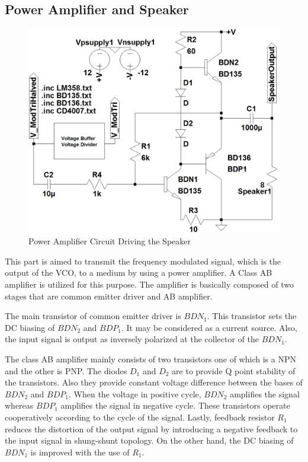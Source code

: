 \documentclass[paper]{IEEEtran}
\begin{document}
\subsection{Power Amplifier and Speaker}
\begin{figure}[h!]
 \setlength{\unitlength}{\textwidth}
 \center 
 \includegraphics[width=0.45\unitlength]{PowerAmp_Circuit}
 \caption{\label{fig:PowerAmp_Circuit}Power Amplifier Circuit Driving the Speaker}
\end{figure}
This part is aimed to transmit the frequency modulated signal, which is the output of the VCO, to a medium by using a power amplifier. A Class AB amplifier is utilized for this purpose. The amplifier is basically composed of two stages that are common emitter driver and AB amplifier.

The main transistor of common emitter driver is $BDN_{1}$. This transistor sets the DC biasing of $BDN_{2}$ and $BDP_{1}$. It may be considered as a current source. Also, the input signal is output as inversely polarized at the collector of the $BDN_{1}$.

The class AB amplifier mainly consists of two transistors one of which is a NPN and the other is PNP. The diodes $D_{1}$ and $D_{2}$ are to provide Q point stability of the transistors. Also they provide constant voltage difference between the bases of $BDN_{2}$ and $BDP_{1}$. When the voltage in positive cycle, $BDN_{2}$ amplifies the signal whereas $BDP_{1}$ amplifies the signal in negative cycle. These transistors operate cooperatively according to the cycle of the signal. Lastly, feedback resistor $R_{1}$ reduces the distortion of the output signal by introducing a negative feedback to the input signal in shung-shunt topology. On the other hand, the DC biasing of $BDN_{1}$ is improved with the use of $R_{1}$.
\end{document}

